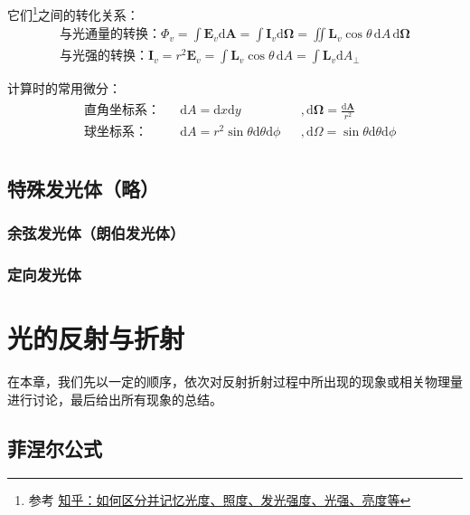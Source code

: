 \documentclass[UTF8]{report}
\theoremstyle{MyLineTheoremStyle} %
\theoremstyle{MyBlockTheoremStyle} %
\theoremstyle{MySubsubsectionStyle} %
\begin{document}
它们\footnote{参考 \href{https://www.zhihu.com/question/53080536/answer/133398317}{知乎：如何区分并记忆光度、照度、发光强度、光强、亮度等}}之间的转化关系：
\begin{gather}
\text{与光通量的转换：} \Phi_v = \int \boldsymbol{E}_v \mathrm{d}\boldsymbol{A} = \int \boldsymbol{I}_v \mathrm{d}\boldsymbol{\Omega} = \iint \boldsymbol{L}_v \cos \theta\, \mathrm{d}A \,\mathrm{d} \boldsymbol{\Omega} \\ 
\text{与光强的转换：} \boldsymbol{I}_v = r^2\boldsymbol{E}_v = \int \boldsymbol{L}_v \cos \theta\, \mathrm{d}A = \int \boldsymbol{L}_v  \mathrm{d}A_{\perp}
\end{gather}

计算时的常用微分：
\begin{gather}
\begin{aligned}
    & \text{直角坐标系：}&& \mathrm{d}A = \mathrm{d}x \mathrm{d}y &&,  \mathrm{d}\boldsymbol{\Omega} = \frac{\mathrm{d}\boldsymbol{A}}{r^2} \\ 
    & \text{球坐标系：}&& \mathrm{d}A = r^2 \sin \theta \mathrm{d}\theta \mathrm{d}\phi &&,\mathrm{d}\Omega = \sin \theta \mathrm{d}\theta \mathrm{d}\phi \\ 
\end{aligned}
\end{gather}

\section{特殊发光体（略）}

\subsection{余弦发光体（朗伯发光体）}

\subsection{定向发光体}


\chapter{光的反射与折射}\thispagestyle{fancy}

在本章，我们先以一定的顺序，依次对反射折射过程中所出现的现象或相关物理量进行讨论，最后给出所有现象的总结。

\section{菲涅尔公式}
\end{document}
